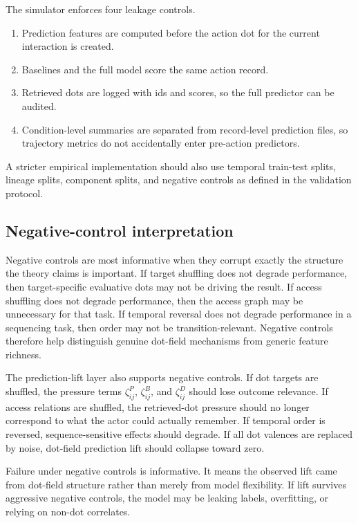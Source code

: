 \documentclass[11pt]{article}
\theoremstyle{remark}
\begin{document}
The simulator enforces four leakage controls.

\begin{enumerate}[leftmargin=*]
\item Prediction features are computed before the action dot for the current
interaction is created.
\item Baselines and the full model score the same action record.
\item Retrieved dots are logged with ids and scores, so the full predictor can
be audited.
\item Condition-level summaries are separated from record-level prediction
files, so trajectory metrics do not accidentally enter pre-action predictors.
\end{enumerate}

A stricter empirical implementation should also use temporal train-test splits,
lineage splits, component splits, and negative controls as defined in the
validation protocol.

\subsection{Negative-control interpretation}\label{prediction-negative-controls}

Negative controls are most informative when they corrupt exactly the structure the theory claims is important. If target shuffling does not degrade performance, then target-specific evaluative dots may not be driving the result. If access shuffling does not degrade performance, then the access graph may be unnecessary for that task. If temporal reversal does not degrade performance in a sequencing task, then order may not be transition-relevant. Negative controls therefore help distinguish genuine dot-field mechanisms from generic feature richness.


The prediction-lift layer also supports negative controls. If dot targets are
shuffled, the pressure terms $\zeta_{ij}^{P}$, $\zeta_{ij}^{B}$, and $\zeta_{ij}^{D}$ should
lose outcome relevance. If access relations are shuffled, the retrieved-dot
pressure should no longer correspond to what the actor could actually remember.
If temporal order is reversed, sequence-sensitive effects should degrade. If
all dot valences are replaced by noise, dot-field prediction lift should
collapse toward zero.

Failure under negative controls is informative. It means the observed lift came
from dot-field structure rather than merely from model flexibility. If lift
survives aggressive negative controls, the model may be leaking labels,
overfitting, or relying on non-dot correlates.
\end{document}
